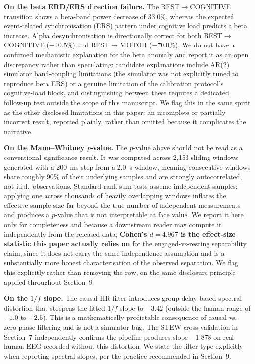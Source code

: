 \documentclass[11pt]{article}
\begin{document}
\textbf{On the beta ERD/ERS direction failure.} The REST$\to$COGNITIVE transition shows a beta-band power decrease of 33.0\%, whereas the expected event-related synchronisation (ERS) pattern under cognitive load predicts a beta increase. Alpha desynchronisation is directionally correct for both REST$\to$COGNITIVE ($-40.5\%$) and REST$\to$MOTOR ($-70.0\%$). We do not have a confirmed mechanistic explanation for the beta anomaly and report it as an open discrepancy rather than speculating; candidate explanations include AR(2) simulator band-coupling limitations (the simulator was not explicitly tuned to reproduce beta ERS) or a genuine limitation of the calibration protocol's cognitive-load block, and distinguishing between these requires a dedicated follow-up test outside the scope of this manuscript. We flag this in the same spirit as the other disclosed limitations in this paper: an incomplete or partially incorrect result, reported plainly, rather than omitted because it complicates the narrative.

\textbf{On the Mann--Whitney $p$-value.} The $p$-value above should not be read as a conventional significance result. It was computed across 2,153 sliding windows generated with a 200~ms step from a 2.0~s window, meaning consecutive windows share roughly 90\% of their underlying samples and are strongly autocorrelated, not i.i.d.\ observations. Standard rank-sum tests assume independent samples; applying one across thousands of heavily overlapping windows inflates the effective sample size far beyond the true number of independent measurements and produces a $p$-value that is not interpretable at face value. We report it here only for completeness and because a downstream reader may compute it independently from the released data; \textbf{Cohen's $d = 4.967$ is the effect-size statistic this paper actually relies on} for the engaged-vs-resting separability claim, since it does not carry the same independence assumption and is a substantially more honest characterisation of the observed separation. We flag this explicitly rather than removing the row, on the same disclosure principle applied throughout Section~9.

\textbf{On the $1/f$ slope.} The causal IIR filter introduces group-delay-based spectral distortion that steepens the fitted $1/f$ slope to $-3.42$ (outside the human range of $-1.0$ to $-2.5$). This is a mathematically predictable consequence of causal vs. zero-phase filtering and is not a simulator bug. The STEW cross-validation in Section~7 independently confirms the pipeline produces slope $-1.878$ on real human EEG recorded without this distortion. We state the filter type explicitly when reporting spectral slopes, per the practice recommended in Section~9.
\end{document}
